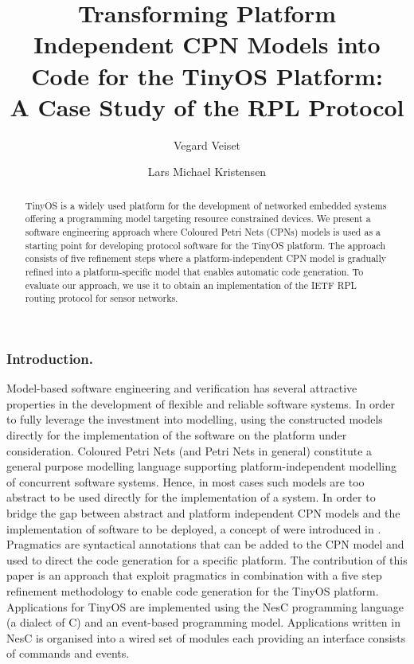 \documentclass{llncs}
\title{Transforming Platform Independent CPN Models into Code for the TinyOS
  Platform: \\ A Case Study of the RPL Protocol}
\author{
  Vegard Veiset \and Lars Michael Kristensen
}
\institute{
  Department of Computing, Bergen University College \\
  Email: \email{vegard.veiset@stud.hib.no,lmkr@hib.no}
}
\begin{document}
\maketitle

\begin{abstract}

TinyOS is a widely used platform for the development of networked
embedded systems offering a programming model targeting resource
constrained devices. We present a software engineering approach where
Coloured Petri Nets (CPNs) models is used as a starting point for
developing protocol software for the TinyOS platform. The approach
consists of five refinement steps where a platform-independent CPN
model is gradually refined into a platform-specific model that enables
automatic code generation. To evaluate our approach, we use it to
obtain an implementation of the IETF RPL routing protocol for sensor
networks.


\end{abstract}

\subsubsection{Introduction.} Model-based software engineering and verification  has several attractive properties in the development of flexible and reliable
software systems. In order to fully leverage the investment into
modelling, using the constructed models directly for the
implementation of the software on the platform under
consideration. Coloured Petri Nets \cite{CPNsttt} (and Petri Nets in
general) constitute a general purpose modelling language supporting
platform-independent modelling of concurrent software systems. Hence,
in most cases such models are too abstract to be used directly for the
implementation of a system. In order to bridge the gap between
abstract and platform independent CPN models and the implementation of
software to be deployed, a concept of  were
introduced in \cite{NWPTpaper}. Pragmatics are syntactical annotations
that can be added to the CPN model and used to direct the code
generation for a specific platform. The contribution of this paper is
an approach \cite{veisetthesis} that exploit pragmatics in combination
with a five step refinement methodology to enable code generation for
the TinyOS platform. Applications for TinyOS \cite{LevisTinyOS} are
implemented using the NesC programming language (a dialect of C) and
an event-based programming model. Applications written in NesC is
organised into a wired set of modules each providing an interface
consists of commands and events.
\end{document}
